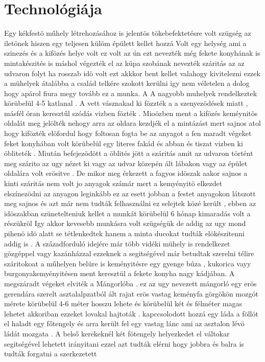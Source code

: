\documentclass[fontsize=12pt, appendixprefix=true]{scrreprt}
\begin{document}
\section{Technológiája}
Egy kékfestö műhely létrehozásához is jelentös tökebefektetésre volt szügség az iletönek  hiszen egy teljesen külöm épülett kellet hozzá 
Volt egy helység ami a szinezés és a kifözés helye volt ez volt az ún ezt nevezték még fekete konyhának is 
mintakészités is máshol végezték el az küpa szobának nevezték 
száritás az az udvaron folyt ha rosszab idö volt ezt akkkor bent kellet valahogy kivitelezni 
 ezzek a mühelyek átalábba a család telkére szokott kerülni igy nem véletelen a dolog hogy apárol fiura megy tovább ez a munka.
 A A nagyobb muhelyek rendelkeztek körübelül 4-5 katlanal .
 A vett vásznakad ki fözzték a a szenyezödések miatt , másfél óran keresztűl szódás vizben fözték .
 Mioözben ment a kifözés  keméynitös oldalát meg jelölték nehogy arra az oldara kezdjék el a mintázást mert sajnos atol hogy kifözték elöfordul hogy foltosan fogta be az anyagot 
 a fen maradt végeket feket konyhában volt körübelül egy literes fakád és abban és tiszat vizben ki öbliteték .
 Miután befejezödött a öblités jött a száritás amit az udvaron történt meg szárito az ugy nézet ki vagy az udvar közepén ált lábakon  vagy az épület oldalára volt erösitve . De mikor meg érkezett a fagyos idöszak aakor sajnos a kinti száritás nem volt jo anyagok számár mert a kemyényitö elkezdet elszínezödni az anyagon  leginkább ez az esett jobban a festet anyagokon látszott meg sajnos és azt már nem tudták felhasználni ez selejtek közé került , ebben az idöszakban szünetelteniuk kellet a munkát körübelül 6 hónap kimaradás volt a részükröl
Igy akkor kevesebb munkásra volt szügségük de addig az ugy mond pihenö idö alatt se tétlenkedtek hanem a minta ducokat tudták elökészitenni addig is .
 A századforduló idejére már több vidéki mühely is rendelkezet gözgéppel vagy kazánházzal ezzeknek a segitségével már betudtak szerelni télire száritokoat a műhelyen belüre is
 keményitésre egy gyenge búza , kukorica  vayy burgonyakemyényitésen ment keresztül a fekete konyha nagy kádjában.
 A megszáradt végeket elviték a Mángorlóba . ez az ugy nevezett mángorló egy erös gerendára szerelt asztalalpzatból ált rajat erös vastag keményfa görgökön mozgót mérete körübelül 4-6 méter hosszu lehete és körübelül két és félméter magas lehetet
 akkoriban ezzeket lovakal hajtoták .
 kapccsolodott hozzá egy láda a föllöt el haladt egy főtengely és arra került fel egy vastag lánc ami az asztalon lévö ládát mozgata .
 A belső kerekeknél két fötengely helyezkedet el váltokar segitségével lehetett irányitani ezzel azt tudták elérni hogy jobbra és balra is tudták forgatni a szerkezetett
\end{document}
